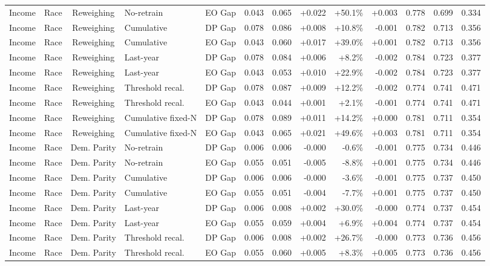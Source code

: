 \begin{longtable}{llcllrrrrrrrr}
Income & Race & Reweighing & No-retrain & EO Gap & 0.043 & 0.065 & +0.022 & +50.1\% & +0.003 & 0.778 & 0.699 & 0.334 \\
Income & Race & Reweighing & Cumulative & DP Gap & 0.078 & 0.086 & +0.008 & +10.8\% & -0.001 & 0.782 & 0.713 & 0.356 \\
Income & Race & Reweighing & Cumulative & EO Gap & 0.043 & 0.060 & +0.017 & +39.0\% & +0.001 & 0.782 & 0.713 & 0.356 \\
Income & Race & Reweighing & Last-year & DP Gap & 0.078 & 0.084 & +0.006 & +8.2\% & -0.002 & 0.784 & 0.723 & 0.377 \\
Income & Race & Reweighing & Last-year & EO Gap & 0.043 & 0.053 & +0.010 & +22.9\% & -0.002 & 0.784 & 0.723 & 0.377 \\
Income & Race & Reweighing & Threshold recal. & DP Gap & 0.078 & 0.087 & +0.009 & +12.2\% & -0.002 & 0.774 & 0.741 & 0.471 \\
Income & Race & Reweighing & Threshold recal. & EO Gap & 0.043 & 0.044 & +0.001 & +2.1\% & -0.001 & 0.774 & 0.741 & 0.471 \\
Income & Race & Reweighing & Cumulative fixed-N & DP Gap & 0.078 & 0.089 & +0.011 & +14.2\% & +0.000 & 0.781 & 0.711 & 0.354 \\
Income & Race & Reweighing & Cumulative fixed-N & EO Gap & 0.043 & 0.065 & +0.021 & +49.6\% & +0.003 & 0.781 & 0.711 & 0.354 \\
Income & Race & Dem. Parity & No-retrain & DP Gap & 0.006 & 0.006 & -0.000 & -0.6\% & -0.001 & 0.775 & 0.734 & 0.446 \\
Income & Race & Dem. Parity & No-retrain & EO Gap & 0.055 & 0.051 & -0.005 & -8.8\% & +0.001 & 0.775 & 0.734 & 0.446 \\
Income & Race & Dem. Parity & Cumulative & DP Gap & 0.006 & 0.006 & -0.000 & -3.6\% & -0.001 & 0.775 & 0.737 & 0.450 \\
Income & Race & Dem. Parity & Cumulative & EO Gap & 0.055 & 0.051 & -0.004 & -7.7\% & +0.001 & 0.775 & 0.737 & 0.450 \\
Income & Race & Dem. Parity & Last-year & DP Gap & 0.006 & 0.008 & +0.002 & +30.0\% & -0.000 & 0.774 & 0.737 & 0.454 \\
Income & Race & Dem. Parity & Last-year & EO Gap & 0.055 & 0.059 & +0.004 & +6.9\% & +0.004 & 0.774 & 0.737 & 0.454 \\
Income & Race & Dem. Parity & Threshold recal. & DP Gap & 0.006 & 0.008 & +0.002 & +26.7\% & -0.000 & 0.773 & 0.736 & 0.456 \\
Income & Race & Dem. Parity & Threshold recal. & EO Gap & 0.055 & 0.060 & +0.005 & +8.3\% & +0.005 & 0.773 & 0.736 & 0.456 \\

\end{longtable}
